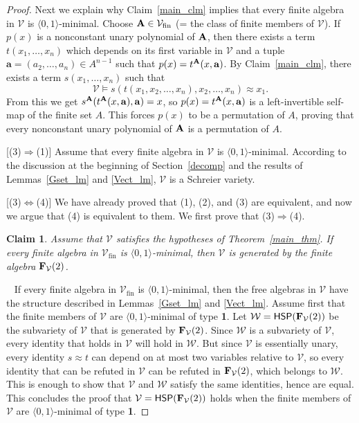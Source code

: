 \documentclass[12pt]{amsart}
\newtheorem{clm}[thm]{Claim}
\theoremstyle{definition}
\numberwithin{equation}{section}
\newcommand{\cproof}{\noindent{\it Proof of Claim.}\ } %
\newcommand{\wec}[1]{{\mathbf{#1}}}  %
\newcommand{\m}[1]{{\mathbf{\uppercase{#1}}}}
\begin{document}
\begin{proof}
Next we explain why Claim~\ref{main_clm} implies
that every finite algebra in $\mathcal V$
is $\langle 0,1\rangle$-minimal.
Choose $\m a\in {\mathcal V}_{\textrm{fin}}$
(= the class of finite members of $\mathcal V$).
If $p(x)$ is a nonconstant unary polynomial of $\m a$,
then there exists a term $t(x_1,\ldots,x_n)$ which
depends on its first variable in $\mathcal V$ and a
tuple $\wec{a}=(a_2,\ldots,a_n)\in A^{n-1}$ such that
$p(x) = t^{\m a}(x,\wec{a})$. By Claim~\ref{main_clm},
there exists a term $s(x_1,\ldots,x_n)$ such that
$$
\mathcal V\models s(t(x_1,x_2,\ldots,x_n),x_2,\ldots,x_n)\approx x_1.
$$
From this we get
$s^{\m a}(t^{\m a}(x,\wec{a}),\wec{a})=x$, so
$p(x)= t^{\m a}(x,\wec{a})$ is a
left-invertible self-map of the finite set $A$.
This forces $p(x)$ to be a permutation of $A$,
proving that every nonconstant unary polynomial of $\m a$
is a permutation of $A$.

[(3)$\Rightarrow$(1)]
Assume that every finite algebra in $\mathcal V$ is
$\langle 0,1\rangle$-minimal.
According to the discussion at the beginning
of Section~\ref{decomp} and the results
of Lemmas~\ref{Gset_lm} and \ref{Vect_lm},
$\mathcal V$ is a Schreier variety.

[(3)$\Leftrightarrow$(4)]
We have already proved that (1), (2), and (3) are equivalent,
and now we argue that (4) is equivalent to them.
We first prove that (3)$\Rightarrow$(4).

\begin{clm} \label{3implies4}
Assume that $\mathcal{V}$ satisfies the hypotheses of Theorem~\ref{main_thm}.
If every finite algebra in $\mathcal{V}_{\textrm{fin}}$
is $\langle 0,1\rangle$-minimal, then $\mathcal{V}$
is generated by the finite algebra $\m f_{\mathcal{V}}(2)$.
\end{clm}

\cproof
If every finite algebra in $\mathcal{V}_{\textrm{fin}}$
is $\langle 0,1\rangle$-minimal, then the free algebras
in $\mathcal V$ have the structure described in Lemmas~\ref{Gset_lm}
and \ref{Vect_lm}. Assume first that 
the finite members of $\mathcal{V}$
are $\langle 0,1\rangle$-minimal of type {\bf 1}.
Let $\mathcal{W}=\mathsf{H}\mathsf{S}\mathsf{P}(\m f_{\mathcal{V}}(2))$
be the subvariety of $\mathcal{V}$ that is generated by
$\m f_{\mathcal{V}}(2)$. Since $\mathcal{W}$ is a subvariety of
$\mathcal{V}$, every identity that holds in
$\mathcal{V}$ will hold in $\mathcal{W}$.
But since $\mathcal{V}$ is essentially unary, every
identity $s\approx t$ can depend on at most
two variables relative to $\mathcal{V}$,
so every identity that can be refuted in
$\mathcal{V}$ can be refuted in
$\m f_{\mathcal{V}}(2)$, which belongs to $\mathcal{W}$.
This is enough to show that
$\mathcal{V}$ and $\mathcal{W}$ satisfy
the same identities, hence are equal.
This concludes the proof that
$\mathcal{V}=\mathsf{H}\mathsf{S}\mathsf{P}(\m f_{\mathcal{V}}(2))$
holds when the finite members of $\mathcal{V}$
are $\langle 0,1\rangle$-minimal of type {\bf 1}.


\end{proof}
\end{document}
